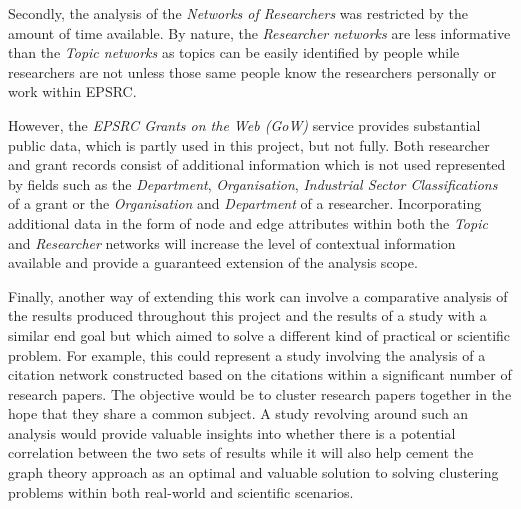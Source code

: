 Secondly, the analysis of the \textit{Networks of Researchers} was restricted by the amount of time available. By nature, the \textit{Researcher networks} are less informative than the \textit{Topic networks} as topics can be easily identified by people while researchers are not unless those same people know the researchers personally or work within EPSRC.

However, the \textit{EPSRC Grants on the Web (GoW)} service provides substantial public data, which is partly used in this project, but not fully. Both researcher and grant records consist of additional information which is not used represented by fields such as the \textit{Department}, \textit{Organisation}, \textit{Industrial Sector Classifications} of a grant or the \textit{Organisation} and \textit{Department} of a researcher. Incorporating additional data in the form of node and edge attributes within both the \textit{Topic} and \textit{Researcher} networks will increase the level of contextual information available and provide a guaranteed extension of the analysis scope.

Finally, another way of extending this work can involve a comparative analysis of the results produced throughout this project and the results of a study with a similar end goal but which aimed to solve a different kind of practical or scientific problem. For example, this could represent a study involving the analysis of a citation network constructed based on the citations within a significant number of research papers. The objective would be to cluster research papers together in the hope that they share a common subject. A study revolving around such an analysis would provide valuable insights into whether there is a potential correlation between the two sets of results while it will also help cement the graph theory approach as an optimal and valuable solution to solving clustering problems within both real-world and scientific scenarios.